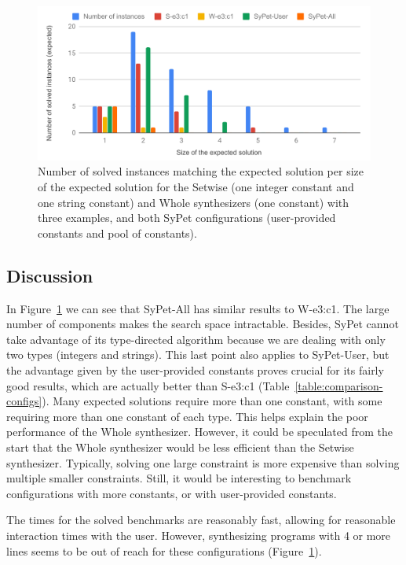 \begin{figure}
  \centering
  \includegraphics[scale=0.7]{assets/comparison-expected-sypet-small.pdf}
  \caption{Number of solved instances matching the expected solution per size of
    the expected solution for the Setwise (one integer constant and one string
    constant) and Whole synthesizers (one constant) with three examples, and
    both SyPet configurations (user-provided constants and pool of constants).}
  \label{fig:comparison-expected-sypet}
\end{figure}

\subsection{Discussion}
\label{sec:discussion}

In Figure~\ref{fig:comparison-expected-sypet} we can see that SyPet-All has
similar results to W-e3:c1.
The large number of components makes the search space intractable.
Besides, SyPet cannot take advantage of its type-directed algorithm because
we are dealing with only two types (integers and strings).
This last point also applies to SyPet-User, but the advantage given by the
user-provided constants proves crucial for its fairly good results, which are
actually better than S-e3:c1 (Table~\ref{table:comparison-configs}).
Many expected solutions require more than one constant, with some requiring more
than one constant of each type.
This helps explain the poor performance of the Whole synthesizer.
However, it could be speculated from the start that the Whole synthesizer would
be less efficient than the Setwise synthesizer.
Typically, solving one large constraint is more expensive than solving multiple
smaller constraints.
Still, it would be interesting to benchmark configurations with more
constants, or with user-provided constants.

The times for the solved benchmarks are reasonably fast, allowing for reasonable
interaction times with the user.
However, synthesizing programs with 4 or more lines seems to be out of reach for
these configurations (Figure~\ref{fig:comparison-expected-sypet}).
